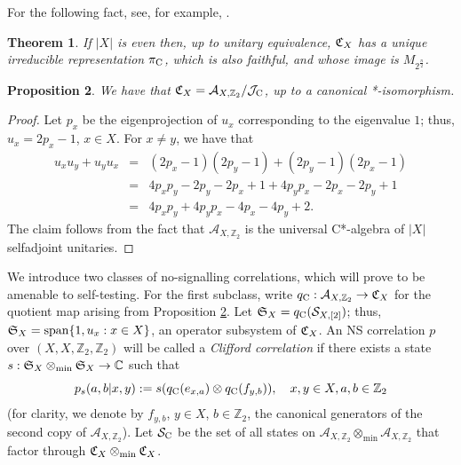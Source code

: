 \documentclass[11pt]{amsart}
\newtheorem{theorem}{Theorem}[section]
\newtheorem{proposition}[theorem]{Proposition}
\theoremstyle{definition}
\newcommand{\cl}[1]{\mathcal{#1}}
\newcommand{\bb}[1]{\mathbb{#1}}
\begin{document}
For the following fact, see, for example, \cite{tsirelson}. 

\begin{theorem}\label{th_Clifone}
If $|X|$ is even then, up to unitary equivalence, $\frak{C}_X$ has a unique 
irreducible representation $\pi_{\rm C}$, which is also 
faithful, and whose image is $M_{2^{\frac{n}{2}}}$.  
\end{theorem}



\begin{proposition}\label{p_cliff}
We have that $\frak{C}_X  = \cl A_{X,\bb{Z}_2}/\cl J_{\rm C}$,
up to a canonical *-isomorphism.
\end{proposition}

\begin{proof}
Let $p_x$ be the eigenprojection of $u_x$ corresponding to the eigenvalue $1$; 
thus, $u_x = 2p_x - 1$, $x\in X$. 
For $x\neq y$, we have that 
\begin{eqnarray*}
u_x u_y + u_y u_x
& = & 
(2p_x - 1)(2p_y - 1)  + (2p_y - 1)(2p_x - 1)\\
& = & 
4 p_x p_y - 2p_y - 2p_x + 1 + 4 p_y p_x - 2p_x - 2p_y + 1\\
& = & 
4 p_x p_y + 4 p_y p_x - 4p_x - 4p_y + 2.
\end{eqnarray*}
The claim follows from the fact that $\cl A_{X,\bb{Z}_2}$ is the universal C*-algebra
of $|X|$ selfadjoint unitaries. 
\end{proof}



We introduce two classes of 
no-signalling correlations, which will prove to 
be amenable to self-testing. 
For the first subclass, write $q_{\rm C} : \cl A_{X,\bb{Z}_2}\to \frak{C}_X$ for the quotient map arising from Proposition \ref{p_cliff}. 
Let $\frak{S}_{X} = q_{\rm C}(\cl S_{X,[2]})$; thus, 
$\frak{S}_{X} = {\rm span}\{1, u_x : x\in X\}$, 
an operator subsystem of $\frak{C}_X$. 
An NS correlation $p$ over $(X,X,\bb{Z}_2,\bb{Z}_2)$ will be called a 
\emph{Clifford correlation} if there exists a state 
$s : \frak{S}_{X}\otimes_{\min} \frak{S}_{X} \to \bb{C}$ 
such that 
$$p_s(a,b|x,y) := s(q_{\rm C}(e_{x,a})\otimes q_{\rm C}(f_{y,b})), \ \ \ x,y\in X, a,b\in \bb{Z}_2$$
(for clarity, we denote by $f_{y,b}$, $y\in X$, $b\in \bb{Z}_2$, the canonical generators of the second copy of 
$\cl A_{X,\bb{Z}_2}$). 
Let $\cl S_{\rm C}$ be the set of all states on 
$\cl A_{X,\bb{Z}_2}\otimes_{\min}\cl A_{X,\bb{Z}_2}$ 
that factor through $\frak{C}_X\otimes_{\min} \frak{C}_X$. 
\end{document}
